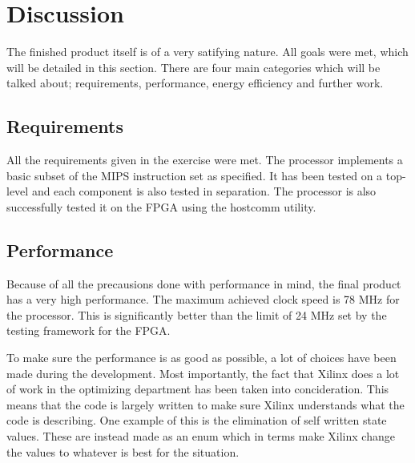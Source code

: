 \section{Discussion}



The finished product itself is of a very satifying nature.
All goals were met, which will be detailed in this section.
There are four main categories which will be talked about;
requirements, performance, energy efficiency and further work.

\subsection{Requirements}
All the requirements given in the exercise were met.
The processor implements a basic subset of the MIPS instruction set \cite[p.64]{compendium} as specified.
It has been tested on a top-level and each component is also tested in separation.
The processor is also successfully tested it on the FPGA using the hostcomm \cite{hostcomm} utility.

\subsection{Performance}
Because of all the precausions done with performance in mind, the final product has a very high performance.
The maximum achieved clock speed is 78 MHz for the processor.
This is significantly better than the limit of 24 MHz set by the testing framework for the FPGA.

To make sure the performance is as good as possible, a lot of choices have been made during the development.
Most importantly, the fact that Xilinx does a lot of work in the optimizing department has been taken into concideration.
This means that the code is largely written to make sure Xilinx understands what the code is describing.
One example of this is the elimination of self written state values.
These are instead made as an enum which in terms make Xilinx change the values to whatever is best for the situation.

